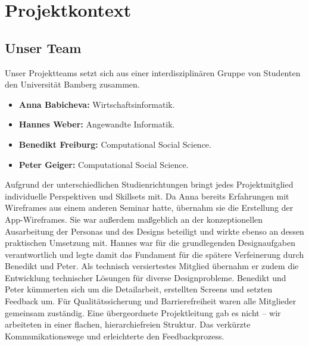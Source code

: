 \section{Projektkontext}
\subsection{Unser Team}
Unser Projektteams setzt sich aus einer interdisziplinären Gruppe von Studenten den Universität Bamberg zusammen.

\begin{itemize}
	\item \textbf{Anna Babicheva:} Wirtschaftsinformatik.
	\item \textbf{Hannes Weber:} Angewandte Informatik.
	\item \textbf{Benedikt Freiburg:} Computational Social Science.
	\item \textbf{Peter Geiger:} Computational Social Science.
\end{itemize}

Aufgrund der unterschiedlichen Studienrichtungen bringt jedes Projektmitglied individuelle Perspektiven und Skillsets mit. Da Anna bereits Erfahrungen mit Wireframes aus einem anderen Seminar hatte, übernahm sie die Erstellung der App-Wireframes. Sie war außerdem maßgeblich an der konzeptionellen Ausarbeitung der Personas und des Designs beteiligt und wirkte ebenso an dessen praktischen Umsetzung mit. Hannes war für die grundlegenden Designaufgaben verantwortlich und legte damit das Fundament für die spätere Verfeinerung durch Benedikt und Peter. Als technisch versiertestes Mitglied übernahm er zudem die Entwicklung technischer Lösungen für diverse Designprobleme. Benedikt und Peter kümmerten sich um die Detailarbeit, erstellten Screens und setzten Feedback um. Für Qualitätssicherung und Barrierefreiheit waren alle Mitglieder gemeinsam zuständig. Eine übergeordnete Projektleitung gab es nicht – wir arbeiteten in einer flachen, hierarchiefreien Struktur. Das verkürzte Kommunikationswege und erleichterte den Feedbackprozess.

